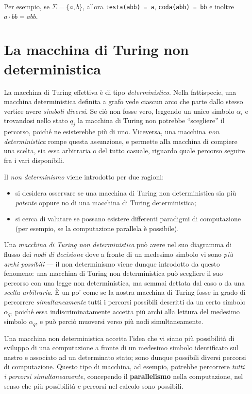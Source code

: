 \documentclass[10pt]{\classname}
\theoremstyle{definition}
\theoremstyle{definition}
\theoremstyle{definition}
\theoremstyle{definition}
\begin{document}
Per esempio, se $\Sigma = \{a, b\}$, allora \texttt{testa(abb) = a}, \texttt{coda(abb) = bb} e inoltre $a \cdot bb = abb$.


\section{La macchina di Turing non deterministica}

La macchina di Turing effettiva è di tipo \emph{deterministico}. Nella
fattispecie, una macchina deterministica definita a grafo vede ciascun arco che
parte dallo stesso vertice avere \emph{simboli diversi}. Se ciò non fosse vero,
leggendo un unico simbolo $\alpha_i$ e trovandosi nello stato $q_j$ la macchina
di Turing non potrebbe ``scegliere'' il percorso, poiché ne esisterebbe più di
uno. Viceversa, una macchina \emph{non deterministica} rompe questa assunzione,
e permette alla macchina di compiere una scelta, sia essa arbitraria o del
tutto casuale, riguardo quale percorso seguire fra i vari disponibili. 

Il \emph{non determinismo} viene introdotto per due ragioni:
\begin{itemize}
    \item si desidera osservare se una macchina di Turing non deterministica
        sia più \emph{potente} oppure no di una macchina di Turing deterministica;
    \item si cerca di valutare se possano esistere differenti paradigmi di
        computazione (per esempio, se la computazione parallela è possibile).
\end{itemize}

Una \emph{macchina di Turing non deterministica} può avere nel suo diagramma di
flusso dei \emph{nodi di decisione} dove a fronte di un medesimo simbolo vi
sono \emph{più archi possibili} --- il non determinismo viene dunque introdotto
da questo fenomeno: una macchina di Turing non deterministica può scegliere il
suo percorso con una legge non deterministica, ma semmai dettata dal caso o da
una \emph{scelta arbitraria}. È un po' come se la nostra macchina di Turing
fosse in grado di percorrere \emph{simultaneamente} tutti i percorsi possibili
descritti da un certo simbolo $\alpha_q$, poiché essa indiscriminatamente
accetta più archi alla lettura del medesimo simbolo $\alpha_q$, e può perciò
muoversi verso più nodi simultaneamente.

Una macchina non deterministica accetta l'idea che vi siano più possibilità di
sviluppo di una computazione a fronte di un medesimo simbolo identificato sul
nastro e associato ad un determinato stato; sono dunque possibili diversi
percorsi di computazione. Questo tipo di macchina, ad esempio, potrebbe
percorrere \emph{tutti i percorsi simultaneamente}, concependo il
\textbf{parallelismo} nella computazione, nel senso che più possibilità e
percorsi nel calcolo sono possibili. 
\end{document}

